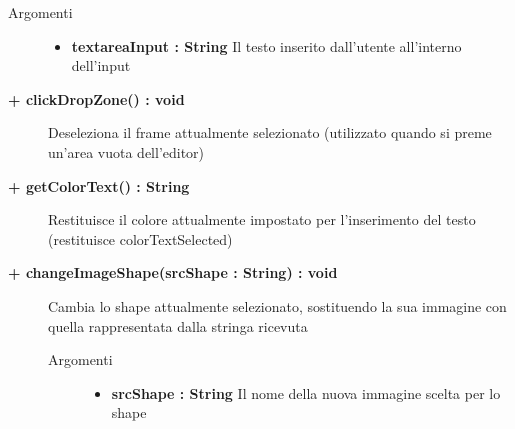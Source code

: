 \begin{description}
\begin{description}
		\begin{description}
			\item[Argomenti] \hfill
				\begin{itemize}
				
					\item \textbf{textareaInput : String	} \hfill
					Il testo inserito dall'utente all'interno dell'input
				\end{itemize}
				
		\end{description}
	\end{description}
	
	\begin{description}
		\item[\textbf{\color{blue}+ clickDropZone() : void	}] \hfill
			Deseleziona il frame attualmente selezionato (utilizzato quando si preme un'area vuota dell'editor)
		
	\end{description}
	
	\begin{description}
		\item[\textbf{\color{blue}+ getColorText() : String	}] \hfill
			Restituisce il colore attualmente impostato per l'inserimento del testo (restituisce colorTextSelected)
		
	\end{description}
	
	\begin{description}
		\item[\textbf{\color{blue}+ changeImageShape(srcShape : String) : void	 	}] \hfill
			Cambia lo shape attualmente selezionato, sostituendo la sua immagine con quella rappresentata dalla stringa ricevuta
			
		\begin{description}
			\item[Argomenti] \hfill
				\begin{itemize}
				
					\item \textbf{srcShape : String	} \hfill
					Il nome della nuova immagine scelta per lo shape
				\end{itemize}
				
		\end{description}
	\end{description}
	

\end{description}
